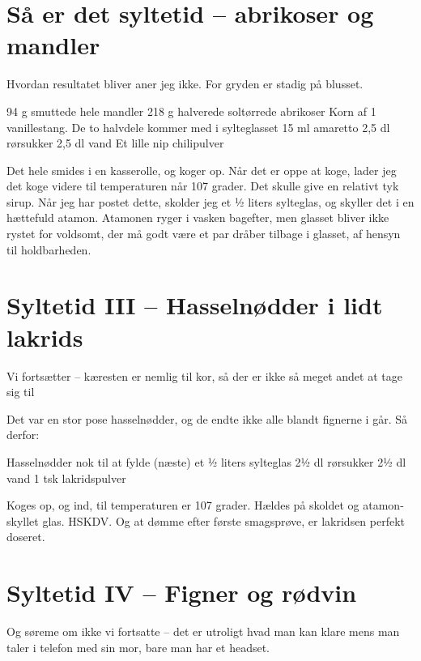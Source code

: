 \documentclass[
]{book}
\begin{document}
\hypertarget{suxe5-er-det-syltetid-abrikoser-og-mandler}{%
\section{Så er det syltetid -- abrikoser og mandler}\label{suxe5-er-det-syltetid-abrikoser-og-mandler}}

Hvordan resultatet bliver aner jeg ikke. For gryden er stadig på blusset.

94 g smuttede hele mandler
218 g halverede soltørrede abrikoser
Korn af 1 vanillestang. De to halvdele kommer med i sylteglasset
15 ml amaretto
2,5 dl rørsukker
2,5 dl vand
Et lille nip chilipulver

Det hele smides i en kasserolle, og koger op. Når det er oppe at koge, lader jeg det koge videre til temperaturen når 107 grader. Det skulle give en relativt tyk sirup. Når jeg har postet dette, skolder jeg et ½ liters sylteglas, og skyller det i en hættefuld atamon. Atamonen ryger i vasken bagefter, men glasset bliver ikke rystet for voldsomt, der må godt være et par dråber tilbage i glasset, af hensyn til holdbarheden.

\hypertarget{syltetid-iii-hasselnuxf8dder-i-lidt-lakrids}{%
\section{Syltetid III -- Hasselnødder i lidt lakrids}\label{syltetid-iii-hasselnuxf8dder-i-lidt-lakrids}}

Vi fortsætter -- kæresten er nemlig til kor, så der er ikke så meget andet at tage sig til

Det var en stor pose hasselnødder, og de endte ikke alle blandt fignerne i går. Så derfor:

Hasselnødder nok til at fylde (næste) et ½ liters sylteglas
2½ dl rørsukker
2½ dl vand
1 tsk lakridspulver

Koges op, og ind, til temperaturen er 107 grader. Hældes på skoldet og atamon-skyllet glas. HSKDV. Og at dømme efter første smagsprøve, er lakridsen perfekt doseret.

\hypertarget{syltetid-iv-figner-og-ruxf8dvin}{%
\section{Syltetid IV -- Figner og rødvin}\label{syltetid-iv-figner-og-ruxf8dvin}}

Og søreme om ikke vi fortsatte -- det er utroligt hvad man kan klare mens man taler i telefon med sin mor, bare man har et headset.
\end{document}
